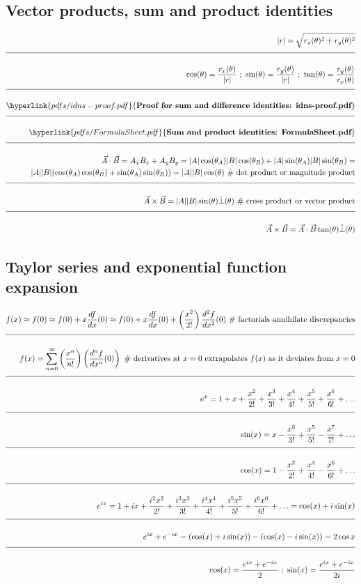 \documentclass[a4paper]{article}
\newcommand{\eqComment}[1]{\text{  \# #1}}
\newcommand{\eqSep}{\text{ ;  }}
\newcommand{\n}{\\[1.5ex] \hline \nonumber \\[0ex]}
\newcommand{\m}{\nonumber \\}
\begin{document}
\subsection{Vector products, sum and product identities}
\begin{tcolorbox}
\begin{align}
   |r| = \sqrt{r_x(\theta)^2 + r_y(\theta)^2}
\n \cos(\theta) = \frac{r_x(\theta)}{|r|} \eqSep \sin(\theta) = \frac{r_y(\theta)}{|r|} \eqSep \tan(\theta) = \frac{r_y(\theta)}{r_x(\theta)}
\n \hyperlink{pdfs/idns-proof.pdf}{\textbf{Proof for sum and difference identities: idns-proof.pdf}}
\n \hyperlink{pdfs/FormulaSheet.pdf}{\textbf{Sum and product identities: FormulaSheet.pdf}}
\n \vec{A} \cdot \vec{B} = A_x B_x + A_y B_y = |A| \cos(\theta_A) |B| \cos(\theta_B) + |A| \sin(\theta_A) |B| \sin(\theta_B) = 
\m |A| |B| (\cos(\theta_A) \cos(\theta_B) + \sin(\theta_A) \sin(\theta_B)) = |A| |B| \cos(\theta) \eqComment{dot product or magnitude product}
\n \vec{A} \times \vec{B} = |A| |B| \sin(\theta) \hat{\perp}(\theta) \eqComment{cross product or vector product}
\n \vec{A} \times \vec{B} = \vec{A} \cdot \vec{B} \tan(\theta) \hat{\perp}(\theta)
\end{align}
\end{tcolorbox}

\subsection{Taylor series and exponential function expansion}
\begin{tcolorbox}
\begin{align}
   f(x) \approx f(0) \approx f(0) + x \frac{df}{dx}(0) \approx f(0) + x \frac{df}{dx}(0) + \left(\frac{x^2}{2!}\right) \frac{d^2f}{dx^2}(0) \eqComment{factorials annihilate discrepancies}
\n f(x) = \sum_{n=0}^{\infty} \left(\frac{x^n}{n!}\right) \left(\frac{d^nf}{dx^n}(0)\right) \eqComment{derivatives at $x=0$ extrapolates $f(x)$ as it deviates from $x=0$}
\n e^x = 1 + x + \frac{x^2}{2!} + \frac{x^3}{3!} + \frac{x^4}{4!} + \frac{x^5}{5!} + \frac{x^6}{6!} + \ldots
\n \sin(x) = x - \frac{x^3}{3!} + \frac{x^5}{5!} - \frac{x^7}{7!} + \ldots
\n \cos(x) = 1 - \frac{x^2}{2!} + \frac{x^4}{4!} - \frac{x^6}{6!} + \ldots
\n e^{ix} = 1 + i x + \frac{i^2 x^2}{2!} + \frac{i^3 x^3}{3!} + \frac{i^4 x^4}{4!} + \frac{i^5 x^5}{5!} + \frac{i^6 x^6}{6!} + \ldots = \cos(x) + i \sin(x)
\n e^{ix} + e^{-ix} = (\cos(x) + i \sin(x)) - (\cos(x) - i \sin(x)) = 2 \cos{x}
\n \cos(x) = \frac{e^{ix} + e^{-ix}}{2} \eqSep \sin(x) = \frac{e^{ix} + e^{-ix}}{2 i}
\end{align}
\end{tcolorbox}
\end{document}
